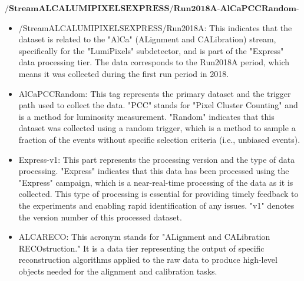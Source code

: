 $\textbf{/StreamALCALUMIPIXELSEXPRESS/Run2018A-AlCaPCCRandom-Express-v1/ALCARECO}$

\begin{itemize}

\item /StreamALCALUMIPIXELSEXPRESS/Run2018A:
This indicates that the dataset is related to the "AlCa" (ALignment and CALibration) stream, specifically for the "LumiPixels" subdetector, and is part of the "Express" data processing tier. The data corresponds to the Run2018A period, which means it was collected during the first run period in 2018.

\item AlCaPCCRandom:
This tag represents the primary dataset and the trigger path used to collect the data. "PCC" stands for "Pixel Cluster Counting" and is a method for luminosity measurement. "Random" indicates that this dataset was collected using a random trigger, which is a method to sample a fraction of the events without specific selection criteria (i.e., unbiased events).

\item Express-v1:
This part represents the processing version and the type of data processing. "Express" indicates that this data has been processed using the "Express" campaign, which is a near-real-time processing of the data as it is collected. This type of processing is essential for providing timely feedback to the experiments and enabling rapid identification of any issues. "v1" denotes the version number of this processed dataset.

\item ALCARECO:
This acronym stands for "ALignment and CALibration RECOstruction." It is a data tier representing the output of specific reconstruction algorithms applied to the raw data to produce high-level objects needed for the alignment and calibration tasks.

\end{itemize}




